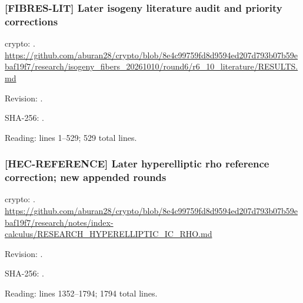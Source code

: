 \par\noindent\begin{minipage}{\linewidth}\small
\subsubsection*{[FIBRES-LIT] Later isogeny literature audit and priority corrections}\label{art:FIBRES-LIT}
crypto: .
\url{https://github.com/aburan28/crypto/blob/8e4c99759fd8d9594ed207d793b07b59ebaf19f7/research/isogeny_fibers_20261010/round6/r6_10_literature/RESULTS.md}
\par Revision: .
\par SHA-256: .
\par Reading: lines 1--529; 529 total lines.
\end{minipage}\par\medskip

\par\noindent\begin{minipage}{\linewidth}\small
\subsubsection*{[HEC-REFERENCE] Later hyperelliptic rho reference correction; new appended rounds}\label{art:HEC-REFERENCE}
crypto: .
\url{https://github.com/aburan28/crypto/blob/8e4c99759fd8d9594ed207d793b07b59ebaf19f7/research/notes/index-calculus/RESEARCH_HYPERELLIPTIC_IC_RHO.md}
\par Revision: .
\par SHA-256: .
\par Reading: lines 1352--1794; 1794 total lines.
\end{minipage}\par\medskip
